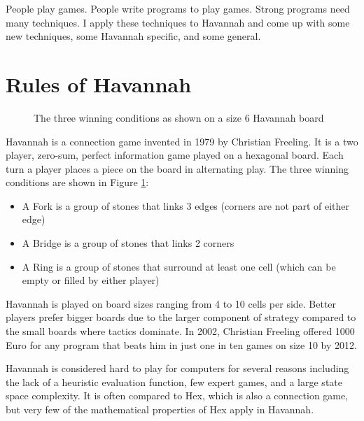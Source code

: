 

People play games. People write programs to play games. Strong programs need many techniques. I apply these techniques to Havannah and come up with some new techniques, some Havannah specific, and some general.

\section{Rules of Havannah}


\begin{figure}[tb]
\centering
\begin{HavannahBoard}[board size=6,coordinate style=classical]
\end{HavannahBoard}
\caption{The three winning conditions as shown on a size 6 Havannah board}
\label{fig:rules}
\end{figure}

Havannah is a connection game invented in 1979 by Christian Freeling. It is a two player, zero-sum, perfect information game played on a hexagonal board. Each turn a player places a piece on the board in alternating play. The three winning conditions are shown in Figure \ref{fig:rules}:
\begin{itemize}
	\setlength{\itemsep}{0pt}
	\setlength{\parskip}{0pt}
	\setlength{\parsep}{0pt}
	\item A Fork is a group of stones that links 3 edges (corners are not part of either edge)
	\item A Bridge is a group of stones that links 2 corners
	\item A Ring is a group of stones that surround at least one cell (which can be empty or filled by either player)
\end{itemize}

Havannah is played on board sizes ranging from 4 to 10 cells per side. Better players prefer bigger boards due to the larger component of strategy compared to the small boards where tactics dominate. In 2002, Christian Freeling offered 1000 Euro for any program that beats him in just one in ten games on size 10 by 2012.

Havannah is considered hard to play for computers for several reasons including the lack of a heuristic evaluation function, few expert games, and a large state space complexity. It is often compared to Hex, which is also a connection game, but very few of the mathematical properties of  Hex apply in Havannah. 

